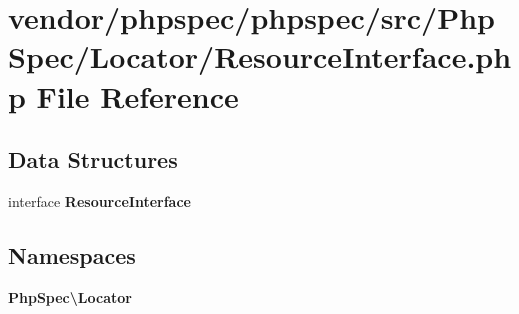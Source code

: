 \section{vendor/phpspec/phpspec/src/\+Php\+Spec/\+Locator/\+Resource\+Interface.php File Reference}
\label{_resource_interface_8php}
\subsection*{Data Structures}
\begin{DoxyCompactItemize}
\item 
interface {\bf Resource\+Interface}
\end{DoxyCompactItemize}
\subsection*{Namespaces}
\begin{DoxyCompactItemize}
\item 
 {\bf Php\+Spec\textbackslash{}\+Locator}
\end{DoxyCompactItemize}
